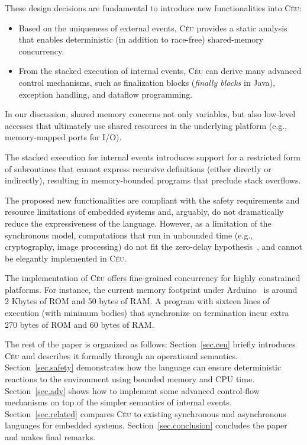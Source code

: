 \documentclass[preprint]{sigplanconf}
\newcommand{\CEU}{\textsc{C\'{e}u}\xspace}
\newcommand{\1}{\;}
\newcommand{\2}{\;\;}
\newcommand{\3}{\;\;\;}
\newcommand{\5}{\;\;\;\;\;}
\begin{document}
These design decisions are fundamental to introduce new functionalities into 
\CEU:

\begin{itemize}
\item Based on the uniqueness of external events, \CEU provides a static 
analysis that enables deterministic (in addition to race-free) shared-memory 
concurrency.
\item From the stacked execution of internal events, \CEU can derive many 
advanced control mechanisms, such as finalization blocks (\emph{finally blocks} 
in Java), exception handling, and dataflow programming.
\end{itemize}

In our discussion, shared memory concerns not only variables, but also 
low-level accesses that ultimately use shared resources in the underlying 
platform (e.g., memory-mapped ports for I/O).

The stacked execution for internal events introduces support for a restricted 
form of subroutines that cannot express recursive definitions (either directly 
or indirectly), resulting in memory-bounded programs that preclude stack 
overflows.

The proposed new functionalities are compliant with the safety requirements and 
resource limitations of embedded systems and, arguably, do not dramatically 
reduce the expressiveness of the language.
However, as a limitation of the synchronous model, computations that run in 
unbounded time (e.g., cryptography, image processing) do not fit the zero-delay 
hypothesis~\cite{rp.hypothesis}, and cannot be elegantly implemented in \CEU.

The implementation of \CEU offers fine-grained concurrency for highly 
constrained platforms.
For instance, the current memory footprint under Arduino~\cite{arduino.cc} is 
around 2 Kbytes of ROM and 50 bytes of RAM.
A program with sixteen lines of execution (with minimum bodies) that 
synchronize on termination incur extra 270 bytes of ROM and 60 bytes of RAM.

The rest of the paper is organized as follows:
Section~\ref{sec.ceu} briefly introduces \CEU and describes it formally through 
an operational semantics.
Section~\ref{sec.safety} demonstrates how the language can ensure deterministic 
reactions to the environment using bounded memory and CPU time.
Section~\ref{sec.adv} shows how to implement some advanced control-flow 
mechanisms on top of the simpler semantics of internal events.
Section~\ref{sec.related} compares \CEU to existing synchronous and 
asynchronous languages for embedded systems.
Section~\ref{sec.conclusion} concludes the paper and makes final remarks.
\end{document}
